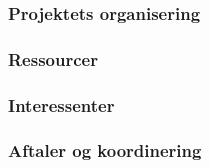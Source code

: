 
\subsubsection{Projektets organisering}
\subsubsection{Ressourcer}
\subsubsection{Interessenter}
\subsubsection{Aftaler og koordinering}
